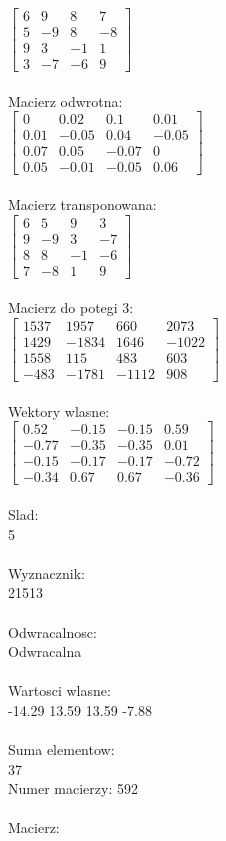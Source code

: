 \documentclass[a4paper,12pt]{article}
\begin{document}
$\begin{bmatrix} 6&9&8&7\\5&-9&8&-8\\9&3&-1&1\\3&-7&-6&9 \end{bmatrix}$
\\
\\
Macierz odwrotna:\\

$\begin{bmatrix} 0&0.02&0.1&0.01\\0.01&-0.05&0.04&-0.05\\0.07&0.05&-0.07&0\\0.05&-0.01&-0.05&0.06 \end{bmatrix}$
\\
\\
Macierz transponowana:\\

$\begin{bmatrix} 6&5&9&3\\9&-9&3&-7\\8&8&-1&-6\\7&-8&1&9 \end{bmatrix}$
\\
\\
Macierz do potegi 3:\\

$\begin{bmatrix} 1537&1957&660&2073\\1429&-1834&1646&-1022\\1558&115&483&603\\-483&-1781&-1112&908 \end{bmatrix}$
\\
\\
Wektory wlasne:\\

$\begin{bmatrix} 0.52&-0.15&-0.15&0.59\\-0.77&-0.35&-0.35&0.01\\-0.15&-0.17&-0.17&-0.72\\-0.34&0.67&0.67&-0.36 \end{bmatrix}$
\\
\\
Slad:\\
5
\\
\\
Wyznacznik:\\
21513
\\
\\
Odwracalnosc:\\
Odwracalna
\\
\\
Wartosci wlasne:\\
-14.29 13.59 13.59 -7.88
\\
\\
Suma elementow:\\
37
\\
\newpage
Numer macierzy:
592
\\
\\
Macierz:\\
\end{document}
